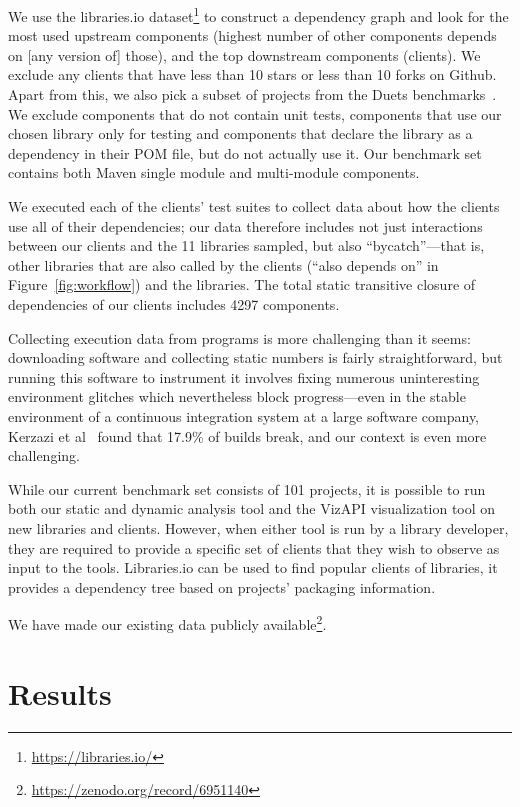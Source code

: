 We use the libraries.io dataset\footnote{\url{https://libraries.io/}} to construct a dependency graph and look for the most used upstream components (highest number of other components depends on [any version of] those), 
and the top downstream components (clients). We exclude any clients that have less than 10 stars or less than 10 forks on Github.  Apart from this, we also pick a subset of projects from the
Duets benchmarks~\cite{durieux21}. We exclude components that do not contain unit tests, components that use our chosen library only for testing
and components that declare the library as a dependency in their POM file, but do not actually use it. Our benchmark set contains both Maven single module and multi-module components.

We executed each of the clients' test suites to collect data about how the clients use all of their dependencies; our data therefore includes not just interactions between our clients and the 11 libraries sampled, but also ``bycatch''---that is, other libraries that are also called by the clients (``also depends on'' in Figure~\ref{fig:workflow}) and the libraries. The total static transitive closure of dependencies of our clients includes 4297 components.

Collecting execution data from programs is more challenging than it seems: downloading software and collecting static numbers is fairly straightforward, but running this software to instrument it involves fixing numerous uninteresting environment glitches which nevertheless block progress---even in the stable environment of a continuous integration system at a large software company, Kerzazi et al~\cite{kerzazi14:_why_do_autom_build_break} found that 17.9\% of builds break, and our context is even more challenging.

While our current benchmark set consists of 101 projects, it is possible to run both our static and dynamic analysis tool and the VizAPI visualization tool on new libraries and clients. However, when either tool is run by a library developer, they are required to provide a specific set of clients that they wish to observe as input to the tools. Libraries.io can be used to find popular clients of libraries, it provides a dependency tree based on projects' packaging information.

We have made our existing data publicly available\footnote{\url{https://zenodo.org/record/6951140}}.

\section{Results}
\label{sec:results}

